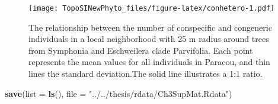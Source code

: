\documentclass[12pt,]{article}
\newenvironment{Shaded}{\begin{snugshade}}{\end{snugshade}}
\newcommand{\DataTypeTok}[1]{\textcolor[rgb]{0.13,0.29,0.53}{#1}}
\newcommand{\KeywordTok}[1]{\textcolor[rgb]{0.13,0.29,0.53}{\textbf{#1}}}
\newcommand{\NormalTok}[1]{#1}
\newcommand{\StringTok}[1]{\textcolor[rgb]{0.31,0.60,0.02}{#1}}
\begin{document}
\newpage

\begin{figure}
\centering
\texttt{[image: TopoSINewPhyto\_files/figure-latex/conhetero-1.pdf]}
\caption{\label{fig:conhetero}The relationship between the number of conspecific and congeneric individuals in a local neighborhood with 25 m radius around trees from Symphonia and Eschweilera clade Parvifolia. Each point represents the mean values for all individuals in Paracou, and thin lines the standard deviation.The solid line illustrates a 1:1 ratio.}
\end{figure}

\begin{Shaded}
\begin{Highlighting}[]
\KeywordTok{save}\NormalTok{(}\DataTypeTok{list =} \KeywordTok{ls}\NormalTok{(), }\DataTypeTok{file =} \StringTok{"../../thesis/rdata/Ch3SupMat.Rdata"}\NormalTok{)}
\end{Highlighting}
\end{Shaded}
\end{document}
